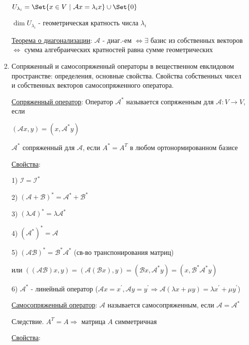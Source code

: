 \documentclass[12pt]{article}
\begin{document}
\begin{enumerate}
        $U_{\lambda_i} = \Set{x \in V \ | \ \mathcal{A}x = \lambda_i x} \union \Set{0}$

        $\dim U_{\lambda_i}$ - геометрическая кратность числа $\lambda_i$

        \hyperlink{diagonalizedmatrixtheorem}{Теорема о диагонализации}: $\mathcal{A}$ - диаг.-ем $\Longleftrightarrow \exists$ базис из собственных векторов $\Longleftrightarrow$ сумма алгебраических кратностей равна сумме геометрических

        \item Сопряженный и самосопряженный операторы в вещественном евклидовом пространстве: определения, основные свойства. Свойства собственных чисел и собственных векторов самосопряженного оператора.

        \hyperlink{conjugateoperator}{Сопряженный оператор}: Оператор $\mathcal{A}^*$ называется сопряженным для $\mathcal{A} : V \to V$, если

        $(\mathcal{A}x, y) = (x, \mathcal{A}^* y)$

        $\mathcal{A}^*$ сопряженный для $\mathcal{A}$, если $A^* = A^T$ в любом ортонормированном базисе

        \hyperlink{conjugateoperatorproperties}{Свойства}:

        1) $\mathcal{I} = \mathcal{I}^*$

        2) $(\mathcal{A} + \mathcal{B})^* = \mathcal{A}^* + \mathcal{B}^*$

        3) $(\lambda \mathcal{A})^* = \lambda \mathcal{A}^*$

        4) $(\mathcal{A}^*)^* = \mathcal{A}$

        5) $(\mathcal{A}\mathcal{B})^* = \mathcal{B}^* \mathcal{A}^*$ (св-во транспонирования матриц)

        или $((\mathcal{AB})x, y) = (\mathcal{A}(\mathcal{B}x), y) = (\mathcal{B}x, \mathcal{A}^* y) = (x, \mathcal{B}^* \mathcal{A}^* y)$

        6) $\mathcal{A}^*$ - линейный оператор ($\mathcal{A}x = x^\prime, \mathcal{A}y = y^\prime \Longrightarrow \mathcal{A}(\lambda x + \mu y) = \lambda x^\prime + \mu y^\prime$)

        \hyperlink{selfconjugateoperator}{Самосопряженный оператор}: $\mathcal{A}$ называется самосопряженным, если $\mathcal{A} = \mathcal{A}^*$

        Следствие. $A^T = A \Longrightarrow$ матрица $A$ симметричная

        \hyperlink{selfconjugateoperatorproperties}{Свойства}:


\end{enumerate}
\end{document}
